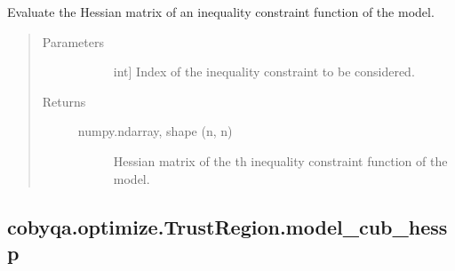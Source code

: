 \documentclass[letterpaper,10pt,english]{sphinxmanual}
\begin{document}
\begin{fulllineitems}
\begin{fulllineitems}
\label{\detokenize{refs/generated/cobyqa.optimize.TrustRegion.model_cub_hess:cobyqa.optimize.TrustRegion.model_cub_hess}}
\sphinxAtStartPar
Evaluate the Hessian matrix of an inequality constraint function of the
model.
\begin{quote}\begin{description}
\item[{Parameters}] \leavevmode\begin{description}
\item[{}] \leavevmode{[}int{]}
\sphinxAtStartPar
Index of the inequality constraint to be considered.

\end{description}

\item[{Returns}] \leavevmode\begin{description}
\item[{numpy.ndarray, shape (n, n)}] \leavevmode
\sphinxAtStartPar
Hessian matrix of the \sphinxhyphen{}th inequality constraint function of the
model.

\end{description}

\end{description}\end{quote}

\end{fulllineitems}



\subsection{cobyqa.optimize.TrustRegion.model\_cub\_hessp}
\label{\detokenize{refs/generated/cobyqa.optimize.TrustRegion.model_cub_hessp:cobyqa-optimize-trustregion-model-cub-hessp}}\label{\detokenize{refs/generated/cobyqa.optimize.TrustRegion.model_cub_hessp::doc}}


\end{fulllineitems}
\end{document}
